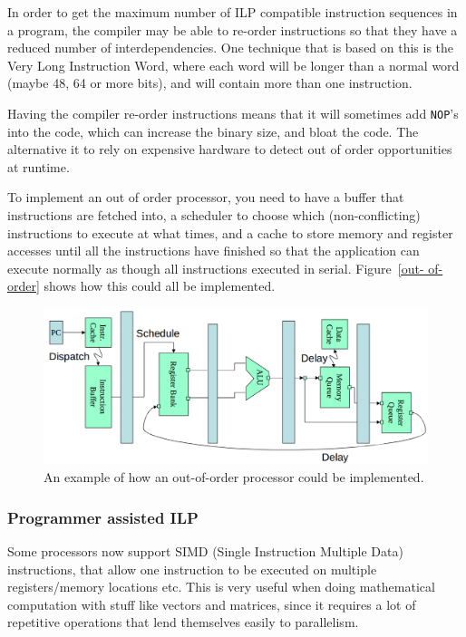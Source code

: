 In order to get the maximum number of ILP compatible instruction sequences in a
program, the compiler may be able to re-order instructions so that they have a
reduced number of interdependencies. One technique that is based on this is the
Very Long Instruction Word, where each word will be longer than a normal word
(maybe 48, 64 or more bits), and will contain more than one instruction.

Having the compiler re-order instructions means that it will sometimes add
\texttt{NOP}'s into the code, which can increase the binary size, and bloat the
code. The alternative it to rely on expensive hardware to detect out of order
opportunities at runtime.

To implement an out of order processor, you need to have a buffer that
instructions are fetched into, a scheduler to choose which (non-conflicting)
instructions to execute at what times, and a cache to store memory and register
accesses until all the instructions have finished so that the application can
execute normally as though all instructions executed in serial. Figure~\ref{out-
of-order} shows how this could all be implemented.

\begin{figure}[H]
  \centering
  \includegraphics[width=\textwidth]{images/out-of-order}
  \caption{An example of how an out-of-order processor could be implemented.}
  \label{out-of-order}
\end{figure}

\subsubsection{Programmer assisted ILP}

Some processors now support SIMD (Single Instruction Multiple Data)
instructions, that allow one instruction to be executed on multiple
registers/memory locations etc. This is very useful when doing mathematical
computation with stuff like vectors and matrices, since it requires a lot of
repetitive operations that lend themselves easily to parallelism.

